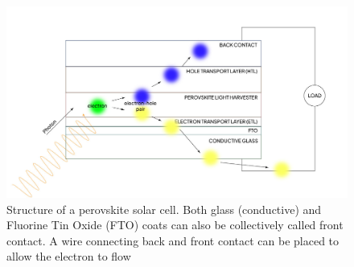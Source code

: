 \begin{figure}[H]
\includegraphics[width=14 cm]{img-content/psc-mechanism2.jpg}
\caption{Structure of a perovskite solar cell. Both glass (conductive) and Fluorine Tin Oxide (FTO) coats can also be collectively called front contact. A wire connecting back and front contact can be placed to allow the electron to flow\label{fig1}}
\end{figure}

